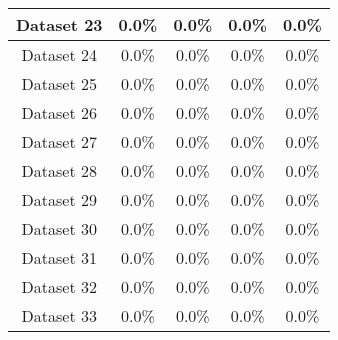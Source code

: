 \begin{table}
\begin{tabular}{ |c||c|c|c|c| }
\hline
Dataset 23 & 0.0\% & 0.0\% & 0.0\% & 0.0\%\\
\hline
Dataset 24 & 0.0\% & 0.0\% & 0.0\% & 0.0\%\\
\hline
Dataset 25 & 0.0\% & 0.0\% & 0.0\% & 0.0\%\\
\hline
Dataset 26 & 0.0\% & 0.0\% & 0.0\% & 0.0\%\\
\hline
Dataset 27 & 0.0\% & 0.0\% & 0.0\% & 0.0\%\\
\hline
Dataset 28 & 0.0\% & 0.0\% & 0.0\% & 0.0\%\\
\hline
Dataset 29 & 0.0\% & 0.0\% & 0.0\% & 0.0\%\\
\hline
Dataset 30 & 0.0\% & 0.0\% & 0.0\% & 0.0\%\\
\hline
Dataset 31 & 0.0\% & 0.0\% & 0.0\% & 0.0\%\\
\hline
Dataset 32 & 0.0\% & 0.0\% & 0.0\% & 0.0\%\\
\hline
Dataset 33 & 0.0\% & 0.0\% & 0.0\% & 0.0\%\\
\hline
\end{tabular}
\end{table}